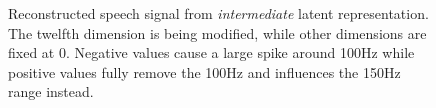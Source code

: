 \begin{figure}
	\centering
	\begin{subfigure}{0.34\textwidth}
		\centering
		
	\end{subfigure}\hfill
	\begin{subfigure}{0.3\textwidth}
		\centering
		
	\end{subfigure}\hfill
	\begin{subfigure}{0.3\textwidth}
		\centering
		
	\end{subfigure}
	
	\vspace{0.5cm} %
	
	\begin{subfigure}{0.36\textwidth}
		\centering
		
	\end{subfigure}\hfill
	\begin{subfigure}{0.3\textwidth}
		\centering
		
	\end{subfigure}\hfill
	\begin{subfigure}{0.3\textwidth}
		\centering
		
	\end{subfigure}
	
	\caption{Reconstructed speech signal from \textit{intermediate} latent representation. The twelfth dimension is being modified, while other dimensions are fixed at 0. Negative values cause a large spike around 100Hz while positive values fully remove the 100Hz and influences the 150Hz range instead.}
	\label{fig:interpol_dim12}
\end{figure}


